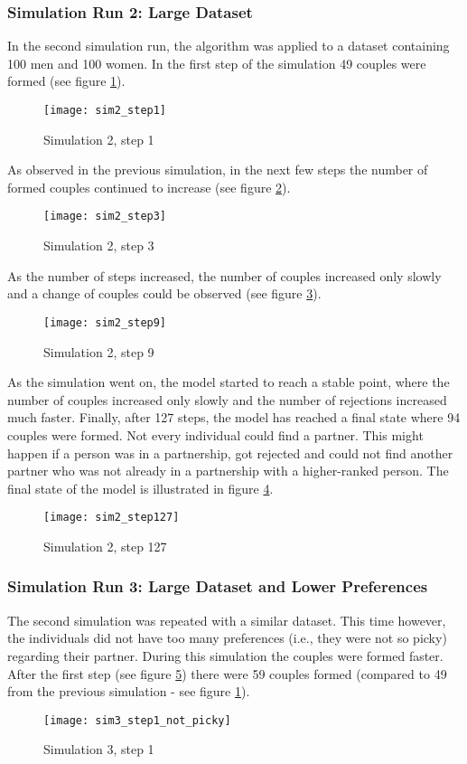 \clearpage
\subsubsection{Simulation Run 2: Large Dataset}
In the second simulation run, the algorithm was applied to a dataset containing 100 men and 100 women. 
In the first step of the simulation 49 couples were formed (see figure \ref{fig:sim2_step1}).
\begin{figure}[H]
  \centering
  \texttt{[image: sim2\_step1]}
	\caption{Simulation 2, step 1}
	\label{fig:sim2_step1}
\end{figure}

As observed in the previous simulation, in the next few steps the number of formed couples continued to increase (see figure \ref{fig:sim2_step3}).
\begin{figure}[H]
  \centering
  \texttt{[image: sim2\_step3]}
	\caption{Simulation 2, step 3}
	\label{fig:sim2_step3}
\end{figure}

As the number of steps increased, the number of couples increased only slowly and a change of couples could be observed (see figure \ref{fig:sim2_step9}).
\begin{figure}[H]
  \centering
  \texttt{[image: sim2\_step9]}
	\caption{Simulation 2, step 9}
	\label{fig:sim2_step9}
\end{figure}

As the simulation went on, the model started to reach a stable point, where the number of couples increased only slowly and the number of rejections increased much faster. 
Finally, after 127 steps, the model has reached a final state where 94 couples were formed. Not every individual could find a partner. This might happen if a person was in a partnership, got rejected and could not find another partner who was not already in a partnership with a higher-ranked person.
The final state of the model is illustrated in figure \ref{fig:sim2_step127}.
\begin{figure}[H]
  \centering
  \texttt{[image: sim2\_step127]}
	\caption{Simulation 2, step 127}
	\label{fig:sim2_step127}
\end{figure}

\clearpage
\subsubsection{Simulation Run 3: Large Dataset and Lower Preferences}
The second simulation was repeated with a similar dataset. 
This time however, the individuals did not have too many preferences (i.e., they were not so picky) regarding their partner.
During this simulation the couples were formed faster. After the first step (see figure \ref{fig:sim3_step1_not_picky}) there were 59 couples formed (compared to 49 from the previous simulation - see figure \ref{fig:sim2_step1}).
\begin{figure}[H]
  \centering
  \texttt{[image: sim3\_step1\_not\_picky]}
	\caption{Simulation 3, step 1}
	\label{fig:sim3_step1_not_picky}
\end{figure}

